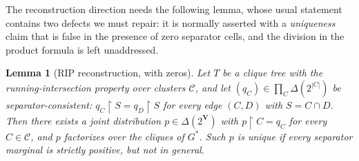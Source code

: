 \documentclass[11pt]{article}
\newtheorem{lemma}{Lemma}
\theoremstyle{definition}
\newcommand{\restr}{\!\restriction\!}
\begin{document}
The reconstruction direction needs the following lemma, whose usual statement contains two defects we
must repair: it is normally asserted with a \emph{uniqueness} claim that is false in the presence of
zero separator cells, and the division in the product formula is left unaddressed.

\begin{lemma}[RIP reconstruction, with zeros]\label{lem:rip}
Let $T$ be a clique tree with the running-intersection property over clusters $\mathcal C$, and let
$(q_C)\in\prod_C\Delta(2^{|C|})$ be separator-consistent: $q_C\restr S=q_D\restr S$ for every edge
$(C,D)$ with $S=C\cap D$. Then there exists a joint distribution $p\in\Delta(2^{\mathbf V})$ with
$p\restr C=q_C$ for every $C\in\mathcal C$, and $p$ factorizes over the cliques of $G^\ast$. Such $p$
is unique if every separator marginal is strictly positive, but \emph{not} in general.
\end{lemma}
\end{document}
